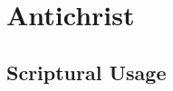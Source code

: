 \section{Antichrist}
	\label{ANTICHRIST}
	





\subsection{Scriptural Usage} %
	\label{ANTICHRIST-SCRIPTURES}

	
	

